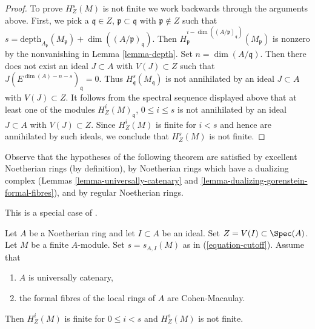 \begin{proof}
\medskip\noindent
To prove $H^s_Z(M)$ is not finite we work
backwards through the arguments above. First, we pick a
$\mathfrak q \in Z$, $\mathfrak p \subset \mathfrak q$
with $\mathfrak p \not \in Z$ such that
$s = \text{depth}_{A_\mathfrak p}(M_\mathfrak p) +
\dim((A/\mathfrak p)_\mathfrak q)$. Then
$H^{i - \dim((A/\mathfrak p)_\mathfrak q)}_\mathfrak p(M_\mathfrak p)$
is nonzero by the nonvanishing in Lemma \ref{lemma-depth}.
Set $n = \dim(A/\mathfrak q)$. Then
there does not exist an ideal $J \subset A$ with $V(J) \subset Z$
such that $J(E^{\dim(A) - n - s})_\mathfrak q = 0$.
Thus $H^s_\mathfrak q(M_\mathfrak q)$ is not
annihilated by an ideal $J \subset A$ with $V(J) \subset Z$.
It follows from the spectral sequence displayed above
that at least one of the modules $H^i_Z(M)_\mathfrak q$,
$0 \leq i \leq s$ is not annihilated by an ideal $J \subset A$
with $V(J) \subset Z$. Since $H^i_Z(M)$ is finite for $i < s$
and hence are annihilated by such ideals,
we conclude that $H^s_Z(M)$ is not finite.
\end{proof}

\noindent
Observe that the hypotheses of the following theorem are satisfied
by excellent Noetherian rings (by definition),
by Noetherian rings which have a dualizing complex
(Lemmas \ref{lemma-universally-catenary} and
\ref{lemma-dualizing-gorenstein-formal-fibres}), and
by regular Noetherian rings.

\begin{theorem}
\label{theorem-finiteness}
\begin{reference}
This is a special case of \cite[Satz 2]{Faltings-finiteness}.
\end{reference}
Let $A$ be a Noetherian ring and let $I \subset A$ be an ideal.
Set $Z = V(I) \subset \Spec(A)$. Let $M$ be a finite $A$-module.
Set $s = s_{A, I}(M)$ as in (\ref{equation-cutoff}).
Assume that
\begin{enumerate}
\item $A$ is universally catenary,
\item the formal fibres of the local rings of $A$ are Cohen-Macaulay.
\end{enumerate}
Then $H^i_Z(M)$ is finite for $0 \leq i < s$ and
$H^s_Z(M)$ is not finite.
\end{theorem}

